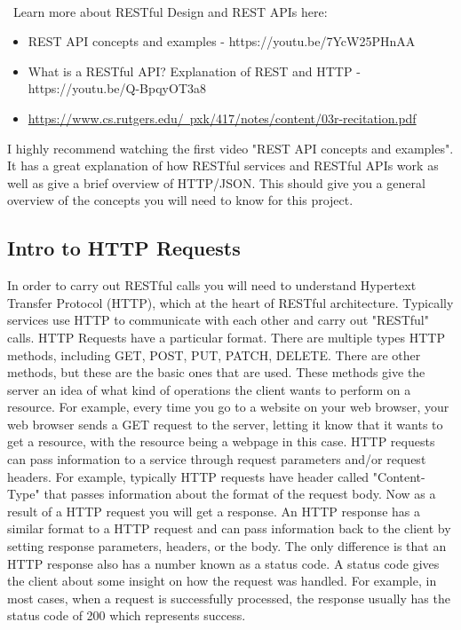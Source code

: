 \documentclass{article}
\newenvironment{info}[1][Info:]{ %
	\medskip
	\begin{mdframed}[style=info]
		\noindent{\textbf{#1}}
}{
	\end{mdframed}
}
\begin{document}
\-\\\ Learn more about RESTful Design and REST APIs here:
\begin{itemize}
\item REST API concepts and examples - https://youtu.be/7YcW25PHnAA 
\item What is a RESTful API? Explanation of REST and HTTP - https://youtu.be/Q-BpqyOT3a8
\item \href{https://www.cs.rutgers.edu/~pxk/417/notes/content/03r-recitation.pdf}{https://www.cs.rutgers.edu/~pxk/417/notes/content/03r-recitation.pdf}
\end{itemize}

\begin{info}[Recommended video:]
I highly recommend watching the first video "REST API concepts and examples". It has a great explanation of how RESTful services and RESTful APIs work as well as give a brief overview of HTTP/JSON. This should give you a general overview of the concepts you will need to know for this project.
\end{info}

\subsection*{Intro to HTTP Requests}
In order to carry out RESTful calls you will need to understand Hypertext Transfer Protocol (HTTP), which at the heart of RESTful architecture. Typically services use HTTP to communicate with each  other and carry out "RESTful" calls. HTTP Requests have a particular format. There are multiple types HTTP methods, including GET, POST, PUT, PATCH, DELETE. There are other methods, but these are the basic ones that are used. These methods give the server an idea of what kind of operations the client wants to perform on a resource. For example, every time you go to a website on your web browser, your web browser sends a GET request to the server, letting it know that it wants to get a resource, with the resource being a webpage in this case. HTTP requests can pass information to a service through request parameters and/or request headers. For example, typically HTTP requests have header called "Content-Type" that passes information about the format of the request body.  Now as a result of a HTTP request you will get a response. An HTTP response has a similar format to a HTTP request and can pass information back to the client by setting response parameters, headers, or the body. The only difference is that an HTTP response also has a number known as a status code. A status code gives the client about some insight on how the request was handled. For example, in most cases, when a request is successfully processed, the response usually has the status code of 200 which represents success. 
\end{document}
